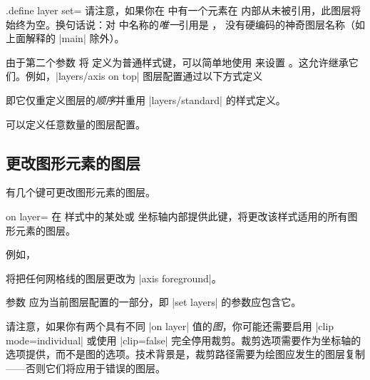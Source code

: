 \begin{handler}{{.define layer set}=}
    请注意，如果你在  中有一个元素在  内部从未被引用，此图层将始终为空。换句话说：对  中名称的\emph{唯一}引用是 ，\PGFPlots{} 没有硬编码的神奇图层名称（如上面解释的 |main| 除外）。

    由于第二个参数  将  定义为普通样式键，可以简单地使用  来设置 。这允许继承它们。例如，|layers/axis on top| 图层配置通过以下方式定义
\begin{codeexample}
\end{codeexample}
    \noindent 即它仅重定义图层的\emph{顺序}并重用 |layers/standard| 的样式定义。

    可以定义任意数量的图层配置。
\end{handler}


\subsection{更改图形元素的图层}

有几个键可更改图形元素的图层。

\begin{pgfplotskey}{on layer=}
    在 \PGFPlots{} 样式中的某处或 \PGFPlots{} 坐标轴内部提供此键，将更改该样式适用的所有图形元素的图层。

    例如，
    \noindent 将把任何网格线的图层更改为 |axis foreground|。

    参数  应为当前图层配置的一部分，即 |set layers| 的参数应包含它。

    请注意，如果你有两个具有不同 |on layer| 值的\emph{图}，你可能还需要启用 |clip mode=individual| 或使用 |clip=false| 完全停用裁剪。裁剪选项需要作为坐标轴的选项提供，而不是图的选项。技术背景是，裁剪路径需要为绘图应发生的图层复制——否则它们将应用于错误的图层。
\end{pgfplotskey}

